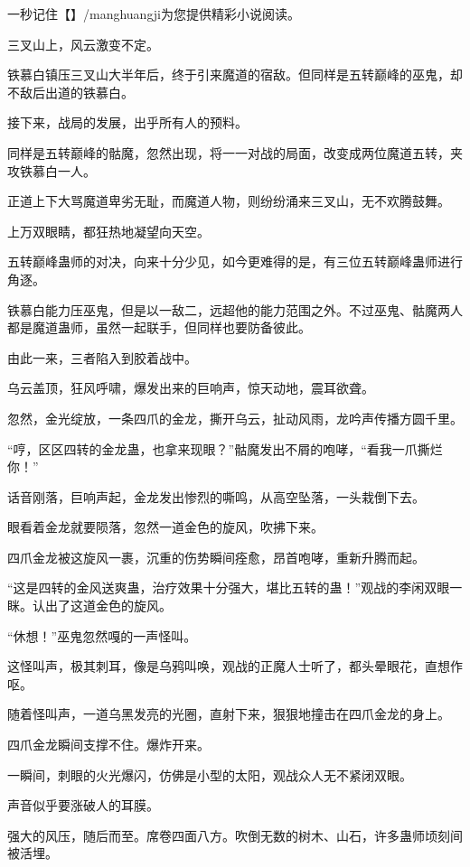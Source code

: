 
\begin{this_body}

一秒记住【】/manghuangji为您提供精彩小说阅读。

三叉山上，风云激变不定。

铁慕白镇压三叉山大半年后，终于引来魔道的宿敌。但同样是五转巅峰的巫鬼，却不敌后出道的铁慕白。

接下来，战局的发展，出乎所有人的预料。

同样是五转巅峰的骷魔，忽然出现，将一一对战的局面，改变成两位魔道五转，夹攻铁慕白一人。

正道上下大骂魔道卑劣无耻，而魔道人物，则纷纷涌来三叉山，无不欢腾鼓舞。

上万双眼睛，都狂热地凝望向天空。

五转巅峰蛊师的对决，向来十分少见，如今更难得的是，有三位五转巅峰蛊师进行角逐。

铁慕白能力压巫鬼，但是以一敌二，远超他的能力范围之外。不过巫鬼、骷魔两人都是魔道蛊师，虽然一起联手，但同样也要防备彼此。

由此一来，三者陷入到胶着战中。

乌云盖顶，狂风呼啸，爆发出来的巨响声，惊天动地，震耳欲聋。

忽然，金光绽放，一条四爪的金龙，撕开乌云，扯动风雨，龙吟声传播方圆千里。

“哼，区区四转的金龙蛊，也拿来现眼？”骷魔发出不屑的咆哮，“看我一爪撕烂你！”

话音刚落，巨响声起，金龙发出惨烈的嘶鸣，从高空坠落，一头栽倒下去。

眼看着金龙就要陨落，忽然一道金色的旋风，吹拂下来。

四爪金龙被这旋风一裹，沉重的伤势瞬间痊愈，昂首咆哮，重新升腾而起。

“这是四转的金风送爽蛊，治疗效果十分强大，堪比五转的蛊！”观战的李闲双眼一眯。认出了这道金色的旋风。

“休想！”巫鬼忽然嘎的一声怪叫。

这怪叫声，极其刺耳，像是乌鸦叫唤，观战的正魔人士听了，都头晕眼花，直想作呕。

随着怪叫声，一道乌黑发亮的光圈，直射下来，狠狠地撞击在四爪金龙的身上。

四爪金龙瞬间支撑不住。爆炸开来。

一瞬间，刺眼的火光爆闪，仿佛是小型的太阳，观战众人无不紧闭双眼。

声音似乎要涨破人的耳膜。

强大的风压，随后而至。席卷四面八方。吹倒无数的树木、山石，许多蛊师顷刻间被活埋。


\end{this_body}

